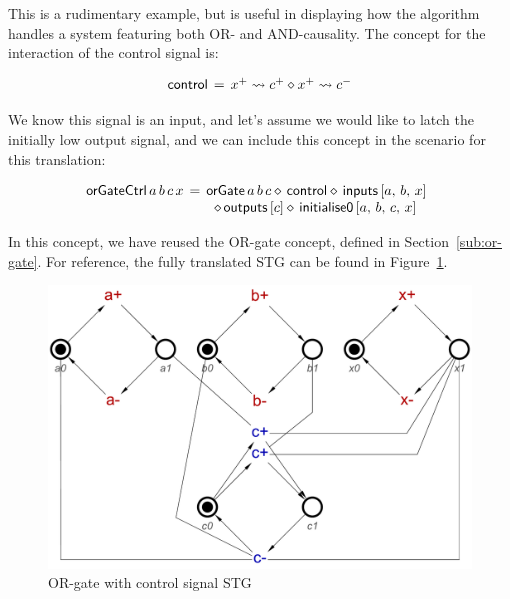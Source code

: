 \documentclass[british,conference,compsoc]{IEEEtran}
\begin{document}
This is a rudimentary example, but is useful in displaying how the algorithm
handles a system featuring both OR- and AND-causality. The concept for 
the interaction of the control signal is:

\[
\begin{array}{lcl}
\mathsf{control}&\hspace{-2mm}=&\hspace{-2mm}x^{+} \rightsquigarrow c^{+} \diamond x^{+} \rightsquigarrow c^{-} 
\end{array}
\]

We know this signal is an input, and let's assume we would like to latch
the initially low output signal, and we can include this concept in the 
scenario for this translation:

\[
\begin{array}{lcl}
\hspace{-2mm}\mathsf{orGateCtrl}\,  a \, b \, c \, x &\hspace{-2mm}=&\hspace{-2mm}\mathsf{orGate}\, a\, b\, c \diamond\, \mathsf{control}
\diamond\, \mathsf{inputs}\, [a,\, b,\, x] \\
&& \diamond \, \mathsf{outputs} \,  [c] \diamond\, \mathsf{initialise0}\, [a,\, b,\, c,\, x]
\end{array}
\]

In this concept, we have reused the OR-gate concept, defined in Section~\ref{sub:or-gate}. 
For reference, the fully translated STG can be found in Figure~\ref{fig:or-gate-ctrl}.


\begin{figure}[h]
\begin{centering}
\includegraphics[scale=0.25]{Images/or-gate-ctrl-stg}
\par\end{centering}
\protect\caption{\label{fig:or-gate-ctrl} OR-gate with control signal STG}
\end{figure}
\end{document}
